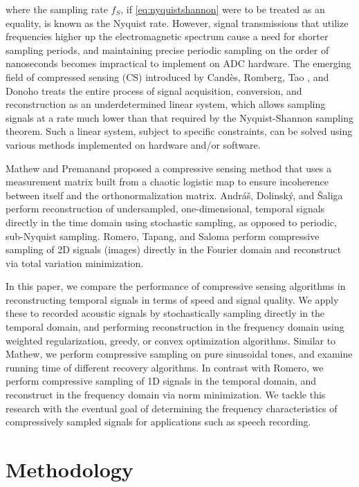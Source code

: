 \documentclass[10pt,a4paper,twoside]{article}
\begin{document}
where the sampling rate $f_S$, if \eqref{eq:nyquistshannon} were to be treated as an equality, is known as the Nyquist rate. However, signal transmissions that utilize frequencies higher up the electromagnetic spectrum cause a need for shorter sampling periods, and maintaining precise periodic sampling on the order of nanoseconds becomes impractical to implement on ADC hardware. The emerging field of compressed sensing (CS) introduced by Cand\`{e}s, Romberg, Tao \cite{candes}, and Donoho \cite{donoho} treats the entire process of signal acquisition, conversion, and reconstruction as an underdetermined linear system, which allows sampling signals at a rate much lower than that required by the Nyquist-Shannon sampling theorem. Such a linear system, subject to specific constraints, can be solved using various methods implemented on hardware and/or software.

Mathew and Premanand \cite{mathew} proposed a compressive sensing method that uses a measurement matrix built from a chaotic logistic map to ensure incoherence between itself and the orthonormalization matrix. Andr\'{a}\v{s}, Dolinsk\'{y}, and \v{S}aliga \cite{andras} perform reconstruction of undersampled, one-dimensional, temporal signals directly in the time domain using stochastic sampling, as opposed to periodic, sub-Nyquist sampling. Romero, Tapang, and Saloma \cite{romero16,romero18} perform compressive sampling of 2D signals (images) directly in the Fourier domain and reconstruct via total variation minimization.

In this paper, we compare the performance of compressive sensing algorithms in reconstructing temporal signals in terms of speed and signal quality. We apply these to recorded acoustic signals by stochastically sampling directly in the temporal domain, and performing reconstruction in the frequency domain using weighted regularization, greedy, or convex optimization algorithms. Similar to Mathew, we perform compressive sampling on pure sinusoidal tones, and examine running time of different recovery algorithms. In contrast with Romero, we perform compressive sampling of 1D signals in the temporal domain, and reconstruct in the frequency domain via norm minimization. We tackle this research with the eventual goal of determining the frequency characteristics of compressively sampled signals for applications such as speech recording.

\section{Methodology}\label{sec:Metho}
\medskip
\end{document}
